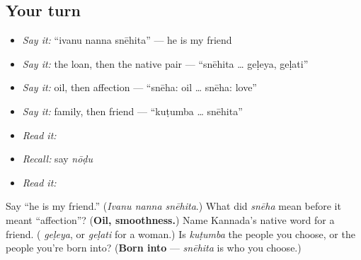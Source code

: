 \subsection*{Your turn}
\begin{itemize}
\raggedright
  \item \emph{Say it:} \textquotedblleft{}ivanu nanna snēhita\textquotedblright{} — he is my friend
  \item \emph{Say it:} the loan, then the native pair — \textquotedblleft{}snēhita … geḷeya, geḷati\textquotedblright{}
  \item \emph{Say it:} oil, then affection — \textquotedblleft{}snēha: oil … snēha: love\textquotedblright{}
  \item \emph{Say it:} family, then friend — \textquotedblleft{}kuṭumba … snēhita\textquotedblright{}
  \item \emph{Read it:} \textbf{}
  \item \emph{Recall:} say \emph{nōḍu}
  \item \emph{Read it:} \textbf{}
\end{itemize}

\begin{tcolorbox}[breakable,colback=teal!4,colframe=teal!35!black,title={Before you move on}]
Say \textquotedblleft{}he is my friend.\textquotedblright{} (\emph{Ivanu nanna snēhita}.) What did \emph{snēha} mean before it meant \textquotedblleft{}affection\textquotedblright{}? (\textbf{Oil, smoothness.}) Name Kannada's native word for a friend. (\emph{\textbf{}} \emph{geḷeya}, or \emph{\textbf{}} \emph{geḷati} for a woman.) Is \emph{kuṭumba} the people you choose, or the people you're born into? (\textbf{Born into} — \emph{snēhita} is who you choose.)
\end{tcolorbox}
